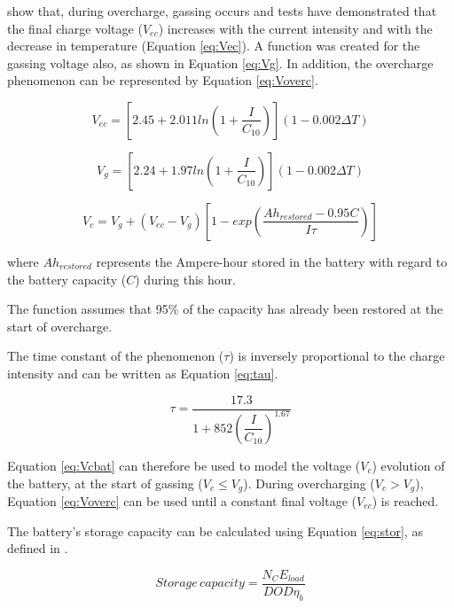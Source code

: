 \cite{Copetti} show that, during overcharge, gassing occurs and tests have demonstrated that the final charge voltage ($ V_{ec} $) increases with the current intensity and with the decrease in temperature (Equation \ref{eq:Vec}). A function was created for the gassing voltage also, as shown in Equation \ref{eq:Vg}. In addition, the overcharge phenomenon can be represented by Equation \ref{eq:Voverc}.

\begin{equation}
\label{eq:Vec}
V_{ec} = \left[ 2.45 + 2.011 ln \left( 1+\dfrac{I}{C_{10}} \right)  \right] (1-0.002 \Delta T)
\end{equation}

\begin{equation}
\label{eq:Vg}
V_{g} = \left[ 2.24 + 1.97 ln \left( 1+\dfrac{I}{C_{10}} \right)  \right] (1-0.002 \Delta T)
\end{equation}

\begin{equation}
\label{eq:Voverc}
V_{c} = V_{g} + (V_{ec} - V_{g}) \left[ 1- exp \left( \dfrac{Ah_{restored}-0.95C}{I\tau}  \right)    \right] 
\end{equation}

\noindent where $ Ah_{restored} $ represents the Ampere-hour stored in the battery with regard to the battery capacity ($ C $) during this hour.

The function assumes that 95\% of the capacity has already been restored at the start of overcharge.

The time constant of the phenomenon ($ \tau $) is inversely proportional to the charge intensity and can be written as Equation \ref{eq:tau}.

\begin{equation}
\label{eq:tau}
\tau = \dfrac{17.3}{1+852 \left( \dfrac{I}{C_{10}} \right) ^{1.67} }
\end{equation}

Equation \ref{eq:Vcbat} can therefore be used to model the voltage ($ V_{c} $) evolution of the battery, at the start of gassing ($ V_{c} \leq V_{g} $). During overcharging ($ V_{c} > V_{g} $), Equation \ref{eq:Voverc} can be used until a constant final voltage ($ V_{ec} $) is reached.

The battery's storage capacity can be calculated using Equation \ref{eq:stor}, as defined in \cite{Wenham}.

\begin{equation}
\label{eq:stor}
Storage \, capacity = \dfrac{N_{C}E_{load}}{DOD \eta _{b}}
\end{equation}

